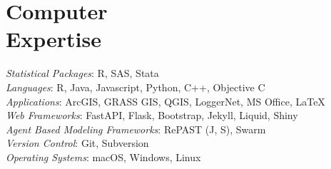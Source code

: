 \section{Computer \\ Expertise} 

\emph{Statistical Packages}:  R, SAS, Stata \\
\emph{Languages}:  R, Java, Javascript, Python, C++, Objective C \\
\emph{Applications}: ArcGIS, GRASS GIS, QGIS, LoggerNet, MS Office, \LaTeX \\
\emph{Web Frameworks}: FastAPI, Flask, Bootstrap, Jekyll, Liquid, Shiny \\
\emph{Agent Based Modeling Frameworks}: RePAST (J, S), Swarm \\
\emph{Version Control}: Git, Subversion \\
\emph{Operating Systems}: macOS, Windows, Linux